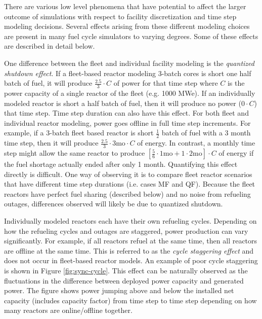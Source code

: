 \documentclass{style}
\begin{document}
There are various low level phenomena that have potential to affect the larger
outcome of simulations with respect to facility discretization and time step
modeling decisions. Several effects arising from these different modeling
choices are present in many fuel cycle simulators to varying degrees.  Some of
these effects are described in detail below.

One difference between the fleet and individual facility modeling is the
\emph{quantized shutdown effect}.  If a fleet-based reactor modeling 3-batch
cores is short one half batch of fuel, it will produce $\frac{2.5}{3}\cdot C$
of power for that time step where $C$ is the power capacity of a single
reactor of the fleet (e.g. 1000 MWe).  If an individually modeled reactor is
short a half batch of fuel, then it will produce no power ($0 \cdot C$) that
time step.  Time step duration can also have this effect.  For both fleet and
individual reactor modeling, power goes offline in full time step increments.
For example, if a 3-batch fleet based reactor is short $\frac{1}{2}$ batch of
fuel with a 3 month time step, then it will produce $\frac{2.5}{3} \cdot 3
\text{mo} \cdot C $ of energy.  In contrast, a monthly time step might allow
the same reactor to produce $[\frac{5}{6} \cdot 1 \text{mo} + 1 \cdot 2
\text{mo}] \cdot C $ of energy if the fuel shortage actually ended after only
1 month.  Quantifying this effect directly is difficult.  One way of observing
it is to compare fleet reactor scenarios that have different time step
durations (i.e. cases MF and QF).  Because the fleet reactors have perfect fuel
sharing (described below) and no noise from refueling outages, differences observed will
likely be due to quantized shutdown.

Individually modeled reactors each have their own refueling cycles.  Depending
on how the refueling cycles and outages are staggered, power production can
vary significantly.  For example, if all reactors refuel at the same time,
then all reactors are offline at the same time.  This is referred to as the
\emph{cycle staggering effect} and does not occur in fleet-based reactor
models.  An example of poor cycle staggering is shown in Figure
\ref{fig:sync-cycle}.  This effect can be naturally observed as the
fluctuations in the difference between deployed power capacity and generated
power.  The figure shows power jumping above and below the installed net
capacity (includes capacity factor) from time step to time step depending on
how many reactors are online/offline together.
\end{document}
